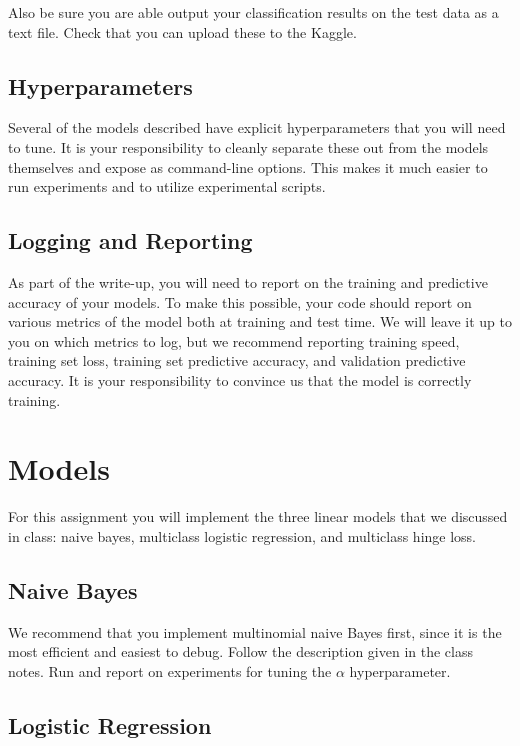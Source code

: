 \documentclass[11pt]{article}
\begin{document}
Also be sure you are able output your classification results on the
test data as a text file. Check that you can upload these to the
Kaggle.

\subsection{Hyperparameters}

Several of the models described have explicit hyperparameters that you will 
need to tune. It is your responsibility to cleanly separate these out from 
the models themselves and expose as command-line options. This makes it much 
easier to run experiments and to utilize experimental scripts. 

\subsection{Logging and Reporting}

As part of the write-up, you will need to report on the training and
predictive accuracy of your models. To make this possible, your code
should report on various metrics of the model both at training and
test time. We will leave it up to you on which metrics to log, but we
recommend reporting training speed, training set loss, training set
predictive accuracy, and validation predictive accuracy. It is your
responsibility to convince us that the model is correctly training.

\section{Models}

For this assignment you will implement the three linear models that 
we discussed in class: naive bayes, multiclass logistic regression, 
and multiclass hinge loss.

\subsection{Naive Bayes}

We recommend that you implement multinomial naive Bayes first, since
it is the most efficient and easiest to debug. Follow the description
given in the class notes. Run and report on experiments for tuning the
$\alpha$ hyperparameter.

\subsection{Logistic Regression}
\end{document}
